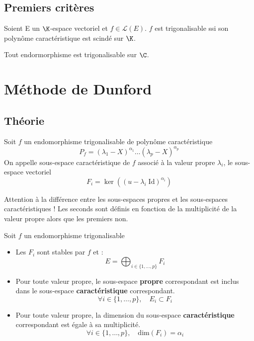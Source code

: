 \subsection{Premiers critères}

\begin{criteria}
    Soient E un $\K$-espace vectoriel et $f \in \mathcal{L}(E)$. $f$ est trigonalisable ssi son polynôme caractéristique est scindé sur $\K$. 
\end{criteria}

\begin{corollary}[La puissance de $\C$]
    Tout endormorphisme est trigonalisable sur $\C$. 
\end{corollary}

\newpage 

\section{Méthode de Dunford}

\subsection{Théorie}

\begin{definition}
    Soit $f$ un endomorphisme trigonalisable de polynôme caractéristique 
        $$ P_f = (\lambda_1 - X)^{\alpha_1} \dots (\lambda_p -X)^{\alpha_p} $$ 
    On appelle sous-espace caractéristique de $f$ associé à la valeur propre $\lambda_i$, le sous-espace vectoriel 
        $$ \boxed{ F_i = \ker((u - \lambda_i \; \text{Id})^{\alpha_i}) } $$ 
\end{definition}

\begin{remark}
    Attention à la différence entre les sous-espaces propres et les sous-espaces caractéristiques !
    Les seconds sont définis en fonction de la multiplicité de la valeur propre alors que les premiers non. 
\end{remark}

\begin{theorem}
    Soit $f$ un endomorphisme trigonalisable
    \begin{itemize}
        \item Les $F_i$ sont stables par $f$ et :
            \[ E = \bigoplus_{i \in \{1,\dots,p\}} F_i \]
        \item Pour toute valeur propre, le sous-espace \textbf{propre} correspondant est inclus dans le sous-espace 
        \textbf{caractéristique} correspondant. 
            \[ \forall i \in \{1,\dots,p\}, \quad E_i \subset F_i \] 
        \item Pour toute valeur propre, la dimension du sous-espace \textbf{caractéristique} correspondant est égale à sa multiplicité. 
            \[ \forall i \in \{1,\dots,p\}, \quad \text{dim}(F_i) = \alpha_i \]
    \end{itemize}
\end{theorem}



